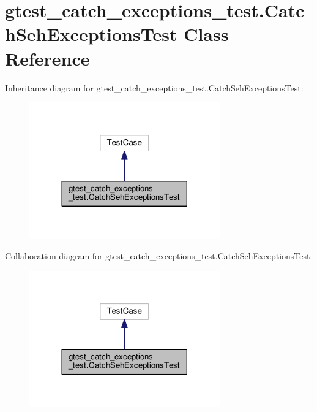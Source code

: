 \hypertarget{classgtest__catch__exceptions__test_1_1CatchSehExceptionsTest}{}\section{gtest\+\_\+catch\+\_\+exceptions\+\_\+test.\+Catch\+Seh\+Exceptions\+Test Class Reference}
\label{classgtest__catch__exceptions__test_1_1CatchSehExceptionsTest}


Inheritance diagram for gtest\+\_\+catch\+\_\+exceptions\+\_\+test.\+Catch\+Seh\+Exceptions\+Test\+:\nopagebreak
\begin{figure}[H]
\begin{center}
\leavevmode
\includegraphics[width=233pt]{classgtest__catch__exceptions__test_1_1CatchSehExceptionsTest__inherit__graph}
\end{center}
\end{figure}


Collaboration diagram for gtest\+\_\+catch\+\_\+exceptions\+\_\+test.\+Catch\+Seh\+Exceptions\+Test\+:\nopagebreak
\begin{figure}[H]
\begin{center}
\leavevmode
\includegraphics[width=233pt]{classgtest__catch__exceptions__test_1_1CatchSehExceptionsTest__coll__graph}
\end{center}
\end{figure}
